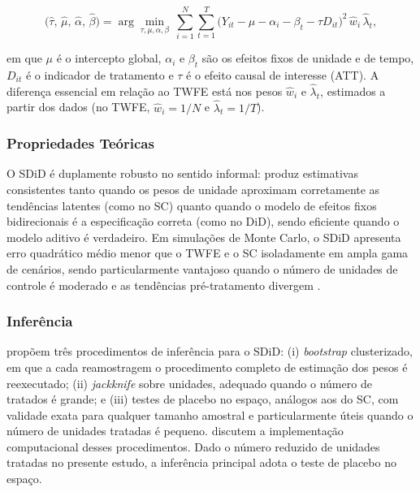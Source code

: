 \documentclass[a4paper,12pt]{article}
\begin{document}
\begin{equation}
\big(\hat{\tau},\, \hat{\mu},\, \hat{\alpha},\, \hat{\beta}\big) =
\arg\min_{\tau,\mu,\alpha,\beta}\ \sum_{i=1}^{N}\sum_{t=1}^{T}
\big(Y_{it} - \mu - \alpha_i - \beta_t - \tau D_{it}\big)^2\, \hat{w}_i\, \hat{\lambda}_t,
\end{equation}

em que $\mu$ é o intercepto global, $\alpha_i$ e $\beta_t$ são os efeitos fixos de unidade
e de tempo, $D_{it}$ é o indicador de tratamento e $\tau$ é o efeito causal de interesse
(ATT). A diferença essencial em relação ao TWFE está nos pesos $\hat{w}_i$ e
$\hat{\lambda}_t$, estimados a partir dos dados (no TWFE, $\hat{w}_i = 1/N$ e
$\hat{\lambda}_t = 1/T$).

\subsubsection{Propriedades Teóricas}

O SDiD é duplamente
robusto no sentido informal: produz estimativas consistentes tanto quando os pesos de
unidade aproximam corretamente as tendências latentes (como no SC) quanto quando o
modelo de efeitos fixos bidirecionais é a especificação correta (como no DiD), sendo
eficiente quando o modelo aditivo é verdadeiro. Em simulações de Monte Carlo, o SDiD
apresenta erro quadrático médio menor que o TWFE e o SC isoladamente em ampla gama de
cenários, sendo particularmente vantajoso quando o número de unidades de controle é
moderado e as tendências pré-tratamento divergem \cite{arkhangelsky2021}.

\subsubsection{Inferência}

 propõem três procedimentos de inferência para o SDiD: (i)
\textit{bootstrap} clusterizado, em que a cada reamostragem o procedimento completo de
estimação dos pesos é reexecutado; (ii) \textit{jackknife} sobre unidades, adequado quando
o número de tratados é grande; e (iii) testes de placebo no espaço, análogos aos do SC,
com validade exata para qualquer tamanho amostral e particularmente úteis quando o
número de unidades tratadas é pequeno.  discutem a implementação
computacional desses procedimentos. Dado o número reduzido de unidades tratadas no
presente estudo, a inferência principal adota o teste de placebo no espaço.
\end{document}
